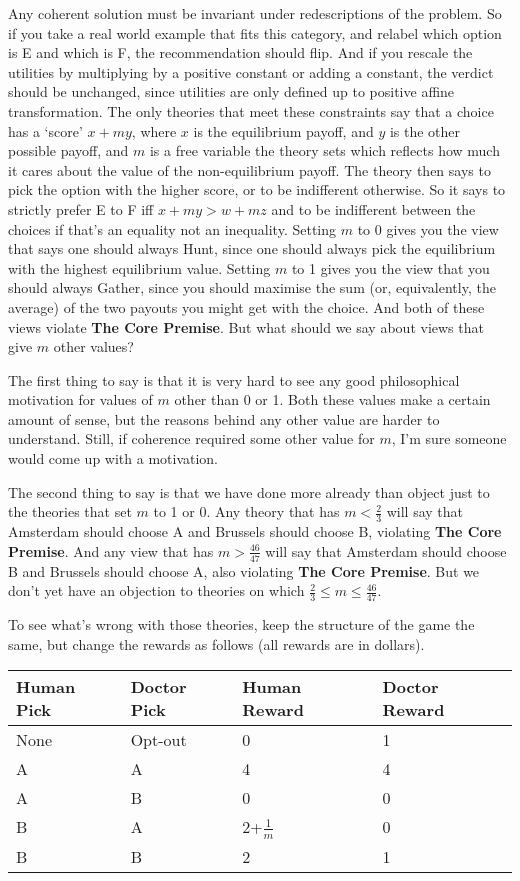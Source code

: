 \documentclass[
  12pt,
]{article}
\begin{document}
Any coherent solution must be invariant under redescriptions of the
problem. So if you take a real world example that fits this category,
and relabel which option is E and which is F, the recommendation should
flip. And if you rescale the utilities by multiplying by a positive
constant or adding a constant, the verdict should be unchanged, since
utilities are only defined up to positive affine transformation. The
only theories that meet these constraints say that a choice has a
`score' \(x + my\), where \(x\) is the equilibrium payoff, and \(y\) is
the other possible payoff, and \(m\) is a free variable the theory sets
which reflects how much it cares about the value of the non-equilibrium
payoff. The theory then says to pick the option with the higher score,
or to be indifferent otherwise. So it says to strictly prefer E to F iff
\(x + my > w + mz\) and to be indifferent between the choices if that's
an equality not an inequality. Setting \(m\) to 0 gives you the view
that says one should always Hunt, since one should always pick the
equilibrium with the highest equilibrium value. Setting \(m\) to 1 gives
you the view that you should always Gather, since you should maximise
the sum (or, equivalently, the average) of the two payouts you might get
with the choice. And both of these views violate \textbf{The Core
Premise}. But what should we say about views that give \(m\) other
values?

The first thing to say is that it is very hard to see any good
philosophical motivation for values of \(m\) other than 0 or 1. Both
these values make a certain amount of sense, but the reasons behind any
other value are harder to understand. Still, if coherence required some
other value for \(m\), I'm sure someone would come up with a motivation.

The second thing to say is that we have done more already than object
just to the theories that set \(m\) to 1 or 0. Any theory that has
\(m < \frac{2}{3}\) will say that Amsterdam should choose A and Brussels
should choose B, violating \textbf{The Core Premise}. And any view that
has \(m > \frac{46}{47}\) will say that Amsterdam should choose B and
Brussels should choose A, also violating \textbf{The Core Premise}. But
we don't yet have an objection to theories on which
\(\frac{2}{3} \leq m \leq \frac{46}{47}\).

To see what's wrong with those theories, keep the structure of the game
the same, but change the rewards as follows (all rewards are in
dollars).

\begin{longtable}[]{@{}llll@{}}
\toprule
Human Pick & Doctor Pick & Human Reward & Doctor Reward \\
\midrule
\endhead
None & Opt-out & 0 & 1 \\
A & A & 4 & 4 \\
A & B & 0 & 0 \\
B & A & 2+\(\frac{1}{m}\) & 0 \\
B & B & 2 & 1 \\
\bottomrule
\end{longtable}
\end{document}

